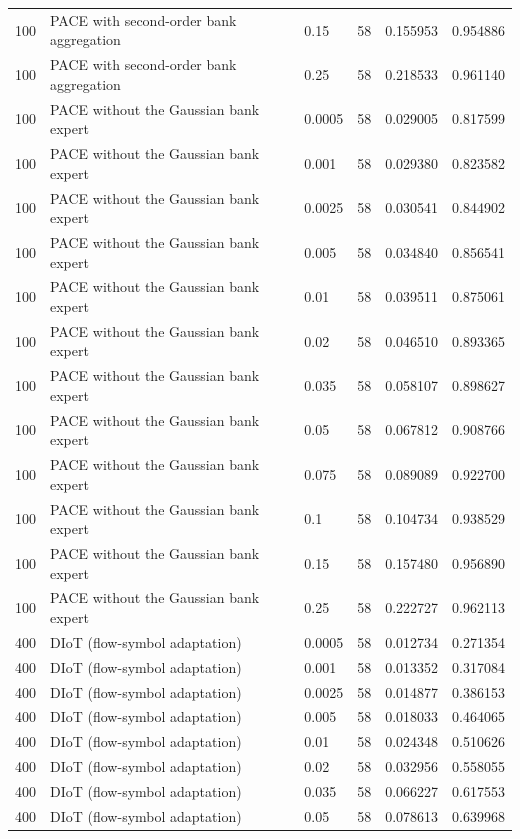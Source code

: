 \begin{tabular}{llllll}
100 & PACE with second-order bank aggregation & 0.15 & 58 & 0.155953 & 0.954886 \\
100 & PACE with second-order bank aggregation & 0.25 & 58 & 0.218533 & 0.961140 \\
100 & PACE without the Gaussian bank expert & 0.0005 & 58 & 0.029005 & 0.817599 \\
100 & PACE without the Gaussian bank expert & 0.001 & 58 & 0.029380 & 0.823582 \\
100 & PACE without the Gaussian bank expert & 0.0025 & 58 & 0.030541 & 0.844902 \\
100 & PACE without the Gaussian bank expert & 0.005 & 58 & 0.034840 & 0.856541 \\
100 & PACE without the Gaussian bank expert & 0.01 & 58 & 0.039511 & 0.875061 \\
100 & PACE without the Gaussian bank expert & 0.02 & 58 & 0.046510 & 0.893365 \\
100 & PACE without the Gaussian bank expert & 0.035 & 58 & 0.058107 & 0.898627 \\
100 & PACE without the Gaussian bank expert & 0.05 & 58 & 0.067812 & 0.908766 \\
100 & PACE without the Gaussian bank expert & 0.075 & 58 & 0.089089 & 0.922700 \\
100 & PACE without the Gaussian bank expert & 0.1 & 58 & 0.104734 & 0.938529 \\
100 & PACE without the Gaussian bank expert & 0.15 & 58 & 0.157480 & 0.956890 \\
100 & PACE without the Gaussian bank expert & 0.25 & 58 & 0.222727 & 0.962113 \\
400 & DIoT (flow-symbol adaptation) & 0.0005 & 58 & 0.012734 & 0.271354 \\
400 & DIoT (flow-symbol adaptation) & 0.001 & 58 & 0.013352 & 0.317084 \\
400 & DIoT (flow-symbol adaptation) & 0.0025 & 58 & 0.014877 & 0.386153 \\
400 & DIoT (flow-symbol adaptation) & 0.005 & 58 & 0.018033 & 0.464065 \\
400 & DIoT (flow-symbol adaptation) & 0.01 & 58 & 0.024348 & 0.510626 \\
400 & DIoT (flow-symbol adaptation) & 0.02 & 58 & 0.032956 & 0.558055 \\
400 & DIoT (flow-symbol adaptation) & 0.035 & 58 & 0.066227 & 0.617553 \\
400 & DIoT (flow-symbol adaptation) & 0.05 & 58 & 0.078613 & 0.639968 \\

\end{tabular}
